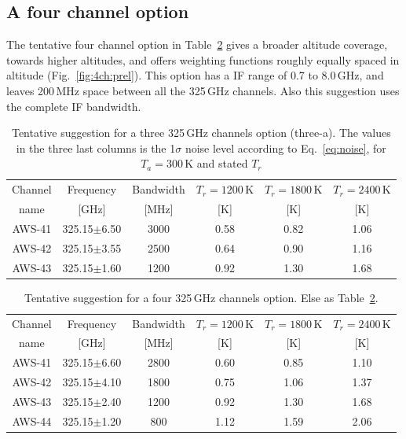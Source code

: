 \documentclass[12pt]{article}
\begin{document}
\subsection{A four channel option}
%
The tentative four channel option in Table~\ref{tab:chs:prel4} gives a broader
altitude coverage, towards higher altitudes, and offers weighting functions
roughly equally spaced in altitude (Fig.~\ref {fig:4ch:prel}). This option has
a IF range of 0.7 to 8.0\,GHz, and leaves 200\,MHz space between all the
325\,GHz channels. Also this suggestion uses the complete IF bandwidth.

\begin{table}[!p]
  \centering  
  \begin{tabular}[c]{c|c|c|ccc}
    Channel & Frequency   & Bandwidth & $T_r=1200$\,K
    & $T_r=1800$\,K & $T_r=2400$\,K\\
    name    & [GHz] &  [MHz] & [K]  & [K] & [K]\\
    \hline
    AWS-41  & 325.15$\pm$6.50 & 3000 & 0.58 & 0.82 & 1.06 \\
    AWS-42  & 325.15$\pm$3.55 & 2500 & 0.64 & 0.90 & 1.16 \\
    AWS-43  & 325.15$\pm$1.60 & 1200 & 0.92 & 1.30 & 1.68 \\
    \hline
  \end{tabular}
  \caption{Tentative suggestion for a three 325\,GHz channels option (three-a). The
    values in the three last columns is the 1$\sigma$ noise level according to
    Eq.~\ref{eq:noise}, for $T_a=300$\,K and stated $T_r$ }
  \label{tab:chs:prel3}
\end{table}

\begin{table}[!p]
  \centering  
  \begin{tabular}[c]{c|c|c|ccc}
    Channel & Frequency   & Bandwidth & $T_r=1200$\,K
    & $T_r=1800$\,K & $T_r=2400$\,K\\
    name    & [GHz] &  [MHz] & [K]  & [K] & [K]\\
    \hline
    AWS-41  & 325.15$\pm$6.60 & 2800 & 0.60 & 0.85 & 1.10 \\
    AWS-42  & 325.15$\pm$4.10 & 1800 & 0.75 & 1.06 & 1.37 \\
    AWS-43  & 325.15$\pm$2.40 & 1200 & 0.92 & 1.30 & 1.68 \\
    AWS-44  & 325.15$\pm$1.20 & \phantom{0}800 & 1.12 & 1.59 & 2.06\\
    \hline
  \end{tabular}
  \caption{Tentative suggestion for a four 325\,GHz channels option. Else as
    Table~\ref{tab:chs:prel4}.}
  \label{tab:chs:prel4}
\end{table}
\end{document}
